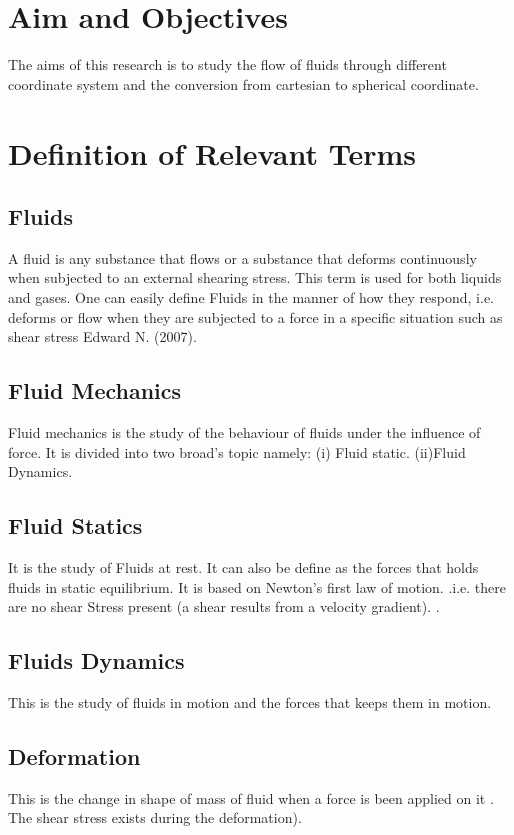 \documentclass[a4paper, 12pt]{report}
\begin{document}
\newpage
\section{Aim and Objectives}
The aims of this research is to study the flow of fluids through different coordinate system and the conversion from cartesian to spherical coordinate.\\



\newpage
\section{Definition of Relevant Terms}
\subsection{Fluids}
A fluid is any substance that flows or a substance that deforms continuously when subjected to an external shearing stress. This term is used for both liquids and gases.
One can easily define Fluids in the manner of how they respond, i.e. deforms or flow when they are subjected to a force in a specific situation such as shear stress Edward N. (2007).



\subsection{Fluid Mechanics }
Fluid mechanics is the study of the behaviour of fluids under the influence of force.
It is divided into two broad’s topic namely:
(i)	Fluid static.
(ii)Fluid Dynamics.


\subsection{Fluid Statics}
It is the study of Fluids at rest. It can also be define as the forces that holds fluids in static equilibrium. It is based on Newton’s first law of motion. .i.e. there are no shear
Stress present (a shear results from a velocity gradient).
.

\subsection{Fluids Dynamics}
This is the study of fluids in motion and the forces that keeps them in motion.

\subsection{Deformation}
This is the change in shape of mass of fluid when a force is been applied on it . The shear stress exists during the deformation).
\end{document}
